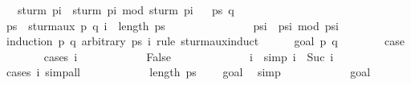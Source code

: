 \begin{isabellebody}
\ \ \ {\isachardoublequoteopen}sturm\ p{\isacharbang}{\isacharparenleft}i{\isacharplus}{}{\isacharparenright}\ {\isacharequal}\ {\isacharminus}{\isacharparenleft}sturm\ p{\isacharbang}i\ mod\ sturm\ p{\isacharbang}{\isacharparenleft}i{\isacharplus}{}{\isacharparenright}{\isacharparenright}{\isachardoublequoteclose}\isanewline
%
\isadelimproof
%
\endisadelimproof
%
\isatagproof
{}\isamarkupfalse%
{\isacharminus}\isanewline
\ \isacommand{{\isacharbraceleft}}\isamarkupfalse%
\isamarkupfalse%
\ ps\ q\isanewline
\ \ \isamarkupfalse%
\ {\isachardoublequoteopen}{\isasymlbrakk}ps\ {\isacharequal}\ sturm{\isacharunderscore}aux\ p\ q{\isacharsemicolon}\ i\ {\isacharless}\ length\ ps\ {\isacharminus}\ {}{\isasymrbrakk}\isanewline
\ \ \ \ \ \ \ \ \ \ \ \ {\isasymLongrightarrow}\ ps{\isacharbang}{\isacharparenleft}i{\isacharplus}{}{\isacharparenright}\ {\isacharequal}\ {\isacharminus}{\isacharparenleft}ps{\isacharbang}i\ mod\ ps{\isacharbang}{\isacharparenleft}i{\isacharplus}{}{\isacharparenright}{\isacharparenright}{\isachardoublequoteclose}\isanewline
\ \ \isamarkupfalse%
\ {\isacharparenleft}induction\ p\ q\ arbitrary{\isacharcolon}\ ps\ i\ rule{\isacharcolon}\ sturm{\isacharunderscore}aux{\isachardot}induct{\isacharparenright}\isanewline
\ \ \ \ \isamarkupfalse%
\ {\isacharparenleft}goal{}\ p\ q{\isacharparenright}\isanewline
\ \ \ \ \ \ \isamarkupfalse%
\ {\isacharquery}case\isanewline
\ \ \ \ \ \ \isamarkupfalse%
\ {\isacharparenleft}cases\ {\isachardoublequoteopen}i\ {\isacharequal}\ {}{\isachardoublequoteclose}{\isacharparenright}\isanewline
\ \ \ \ \ \ \ \ \isamarkupfalse%
\ False\isanewline
\ \ \ \ \ \ \ \ \ \ \isamarkupfalse%
\ \isamarkupfalse%
\ i{\isacharprime}\ \ {\isacharbrackleft}simp{\isacharbrackright}{\isacharcolon}\ {\isachardoublequoteopen}i\ {\isacharequal}\ Suc\ i{\isacharprime}{\isachardoublequoteclose}\ \isamarkupfalse%
\ {\isacharparenleft}cases\ i{\isacharcomma}\ simp{\isacharunderscore}all{\isacharparenright}\isanewline
\ \ \ \ \ \ \ \ \ \ \isamarkupfalse%
\ {\isachardoublequoteopen}length\ ps\ {\isasymge}\ {}{\isachardoublequoteclose}\ \isamarkupfalse%
\ goal{}\ \isamarkupfalse%
\ simp\isanewline
\ \ \ \ \ \ \ \ \ \ \isamarkupfalse%
\ goal{}{\isacharparenleft}{}{\isacharparenright}\ \isamarkupfalse%

\end{isabellebody}
